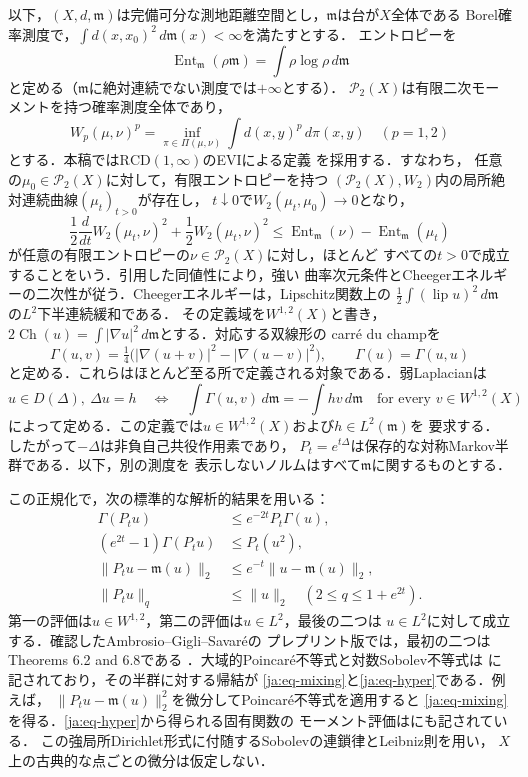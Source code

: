\documentclass[12pt]{amsart}
\theoremstyle{definition}
\theoremstyle{remark}
\numberwithin{equation}{section}
\newcommand{\m}{\mathfrak m}
\newcommand{\RCD}{\mathrm{RCD}}
\theoremstyle{jpplain}
\begin{document}
以下，$(X,d,\m)$は完備可分な測地距離空間とし，$\m$は台が$X$全体である
Borel確率測度で，$\int d(x,x_0)^2\,d\m(x)<\infty$を満たすとする．
エントロピーを
\[
 \operatorname{Ent}_{\m}(\rho\m)=\int\rho\log\rho\,d\m
\]
と定める（$\m$に絶対連続でない測度では$+\infty$とする）．
$\mathcal P_2(X)$は有限二次モーメントを持つ確率測度全体であり，
\[
 W_p(\mu,\nu)^p=\inf_{\pi\in\Pi(\mu,\nu)}\int d(x,y)^p\,d\pi(x,y)
 \quad(p=1,2)
\]
とする．本稿では$\RCD(1,\infty)$のEVIによる定義
\cite[Definition 2.19 and Theorem 5.1]{ja:AGS}を採用する．すなわち，
任意の$\mu_0\in\mathcal P_2(X)$に対して，有限エントロピーを持つ
$(\mathcal P_2(X),W_2)$内の局所絶対連続曲線$(\mu_t)_{t>0}$が存在し，
$t\downarrow0$で$W_2(\mu_t,\mu_0)\to0$となり，
\[
 \frac12\frac{d}{dt}W_2(\mu_t,\nu)^2
 +\frac12W_2(\mu_t,\nu)^2
 \leq\operatorname{Ent}_{\m}(\nu)-\operatorname{Ent}_{\m}(\mu_t)
\]
が任意の有限エントロピーの$\nu\in\mathcal P_2(X)$に対し，ほとんど
すべての$t>0$で成立することをいう．引用した同値性により，強い
曲率次元条件とCheegerエネルギーの二次性が従う．Cheegerエネルギーは，Lipschitz関数上の
$\frac12\int(\operatorname{lip}u)^2\,d\m$の$L^2$下半連続緩和である．
その定義域を$W^{1,2}(X)$と書き，
$2\operatorname{Ch}(u)=\int|\nabla u|^2\,d\m$とする．対応する双線形の
carré du champを
\[
 \Gamma(u,v)=\tfrac14\bigl(|\nabla(u+v)|^2-|\nabla(u-v)|^2\bigr),
 \qquad\Gamma(u)=\Gamma(u,u)
\]
と定める．これらはほとんど至る所で定義される対象である．弱Laplacianは
\begin{equation}\label{ja:eq-generator}
 u\in D(\Delta),\ \Delta u=h
 \quad\Longleftrightarrow\quad
 \int\Gamma(u,v)\,d\m=-\int hv\,d\m
 \quad\text{for every }v\in W^{1,2}(X)
\end{equation}
によって定める．この定義では$u\in W^{1,2}(X)$および$h\in L^2(\m)$を
要求する．したがって$-\Delta$は非負自己共役作用素であり，
$P_t=e^{t\Delta}$は保存的な対称Markov半群である．以下，別の測度を
表示しないノルムはすべて$\m$に関するものとする．

この正規化で，次の標準的な解析的結果を用いる：
\begin{align}
 \Gamma(P_tu)&\leq e^{-2t}P_t\Gamma(u),\label{ja:eq-BE}\\
 (e^{2t}-1)\Gamma(P_tu)&\leq P_t(u^2),\label{ja:eq-reverse}\\
 \|P_tu-\m(u)\|_2&\leq e^{-t}\|u-\m(u)\|_2,\label{ja:eq-mixing}\\
 \|P_tu\|_q&\leq\|u\|_2\quad(2\leq q\leq1+e^{2t}).\label{ja:eq-hyper}
\end{align}
第一の評価は$u\in W^{1,2}$，第二の評価は$u\in L^2$，最後の二つは
$u\in L^2$に対して成立する．確認したAmbrosio--Gigli--Savaréの
プレプリント版では，最初の二つはTheorems 6.2 and 6.8である
\cite{ja:AGS}．大域的Poincaré不等式と対数Sobolev不等式は
\cite[\S2.1]{ja:GKKO}に記されており，その半群に対する帰結が
\eqref{ja:eq-mixing}と\eqref{ja:eq-hyper}である．例えば，
$\|P_tu-\m(u)\|_2^2$を微分してPoincaré不等式を適用すると
\eqref{ja:eq-mixing}を得る．\eqref{ja:eq-hyper}から得られる固有関数の
モーメント評価は\cite[Proposition 3.2(i)]{ja:BF}にも記されている．
この強局所Dirichlet形式に付随するSobolevの連鎖律とLeibniz則を用い，
$X$上の古典的な点ごとの微分は仮定しない．
\end{document}
